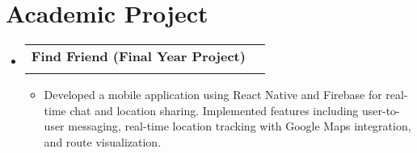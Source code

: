 \documentclass[letterpaper,11pt]{article}
\makeatletter
\newcommand{\resumeItem}[1]{
  \item[]\small{
    {#1 \vspace{-2pt}}
  }
}
\newcommand{\resumeSubheading}[4]{
  \vspace{-1pt}\item
    \begin{tabular*}{0.97\textwidth}[t]{l@{\extracolsep{\fill}}r}
      \textbf{#1} &  {\small#2} \\
      {\small#3} & {\small #4} \\
    \end{tabular*}\vspace{-6pt}
}
\newcommand{\resumeSubHeadingListStart}{\begin{itemize}[leftmargin=0.15in, label={}]}
\newcommand{\resumeSubHeadingListEnd}{\end{itemize}}
\newcommand{\resumeItemListStart}{\begin{itemize}[leftmargin=0.15in, label={}]}
\newcommand{\resumeItemListEnd}{\end{itemize}\vspace{-4pt}}
\makeatother
\begin{document}
\section{Academic Project}
  \resumeSubHeadingListStart
      \resumeSubheading
      {Find Friend (Final Year Project)}{}{}{}\vspace{-12pt}
      \resumeItemListStart
        \resumeItem{Developed a mobile application using React Native and Firebase for real-time chat and location sharing. Implemented features including user-to-user messaging, real-time location tracking with Google Maps integration, and route visualization.}
    \resumeItemListEnd
  \resumeSubHeadingListEnd
\end{document}
